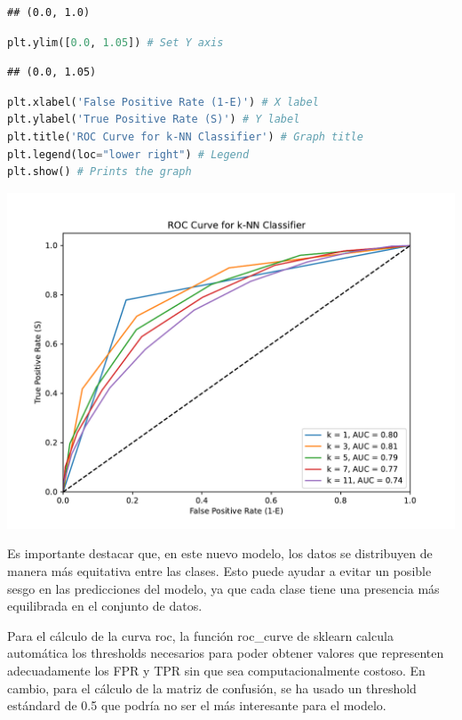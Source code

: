\documentclass[
]{article}
\begin{document}
\begin{lstlisting}
## (0.0, 1.0)
\end{lstlisting}

\begin{lstlisting}[language=Python]
plt.ylim([0.0, 1.05]) # Set Y axis
\end{lstlisting}

\begin{lstlisting}
## (0.0, 1.05)
\end{lstlisting}

\begin{lstlisting}[language=Python]
plt.xlabel('False Positive Rate (1-E)') # X label
plt.ylabel('True Positive Rate (S)') # Y label
plt.title('ROC Curve for k-NN Classifier') # Graph title
plt.legend(loc="lower right") # Legend
plt.show() # Prints the graph
\end{lstlisting}

\includegraphics{code_files/figure-latex/unnamed-chunk-8-1.pdf}

Es importante destacar que, en este nuevo modelo, los datos se
distribuyen de manera más equitativa entre las clases. Esto puede ayudar
a evitar un posible sesgo en las predicciones del modelo, ya que cada
clase tiene una presencia más equilibrada en el conjunto de datos.

Para el cálculo de la curva roc, la función roc\_curve de sklearn
calcula automática los thresholds necesarios para poder obtener valores
que representen adecuadamente los FPR y TPR sin que sea
computacionalmente costoso. En cambio, para el cálculo de la matriz de
confusión, se ha usado un threshold estándard de 0.5 que podría no ser
el más interesante para el modelo.
\end{document}
